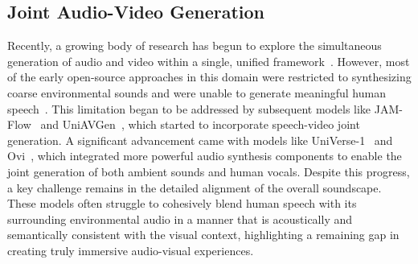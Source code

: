 \subsection{Joint Audio-Video Generation}

Recently, a growing body of research has begun to explore the simultaneous generation of audio and video within a single, unified framework~\citep{liu2025javisdit,ruan2023mmdiffusion,low2025ovi,wang2025universe,wang2025av,xing2024seeing,zhang2025uniavgen}. However, most of the early open-source approaches in this domain were restricted to synthesizing coarse environmental sounds and were unable to generate meaningful human speech~\citep{liu2025javisdit,ruan2023mmdiffusion,ishii2024simple}. This limitation began to be addressed by subsequent models like JAM-Flow~\cite{kwon2025jam} and UniAVGen~\cite{zhang2025uniavgen}, which started to incorporate speech-video joint generation. A significant advancement came with models like UniVerse-1~\citep{wang2025universe} and Ovi~\citep{low2025ovi}, which integrated more powerful audio synthesis components to enable the joint generation of both ambient sounds and human vocals. Despite this progress, a key challenge remains in the detailed alignment of the overall soundscape. These models often struggle to cohesively blend human speech with its surrounding environmental audio in a manner that is acoustically and semantically consistent with the visual context, highlighting a remaining gap in creating truly immersive audio-visual experiences.
